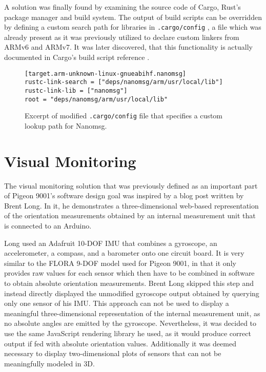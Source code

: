 A solution was finally found by examining the source code of Cargo, Rust's package manager and build system. The output of build scripts can be overridden by defining a custom search path for libraries in \texttt{.cargo/config} \cite{cargo-source}, a file which was already present as it was previously utilized to declare custom linkers from ARMv6 and ARMv7. It was later discovered, that this functionality is actually documented in Cargo's build script reference \cite{cargo-build-reference}.

\begin{figure}[H]
\begin{verbatim}
[target.arm-unknown-linux-gnueabihf.nanomsg]
rustc-link-search = ["deps/nanomsg/arm/usr/local/lib"]
rustc-link-lib = ["nanomsg"]
root = "deps/nanomsg/arm/usr/local/lib"
\end{verbatim}
\caption{Excerpt of modified \texttt{.cargo/config} file that specifies a custom lookup path for Nanomsg.} 
\end{figure}

\newpage

\section{Visual Monitoring}
\author{Sebastian Schaffler}

The visual monitoring solution that was previously defined as an important part of Pigeon 9001's software design goal was inspired by a blog post \cite{visualize-imu-theejs-node} written by Brent Long. In it, he demonstrates a three-dimensional web-based representation of the orientation measurements obtained by an internal measurement unit that is connected to an Arduino.

Long used an Adafruit 10-DOF IMU \cite{adafruit-10dof} that combines a gyroscope, an accelerometer, a compass, and a barometer onto one circuit board. It is very similar to the FLORA 9-DOF \cite{imu} model used for Pigeon 9001, in that it only provides raw values for each sensor which then have to be combined in software to obtain absolute orientation measurements. Brent Long skipped this step and instead directly displayed the unmodified gyroscope output obtained by querying only one sensor of his IMU. 
This approach can not be used to display a meaningful three-dimensional representation of the internal measurement unit, as no absolute angles are emitted by the gyroscope. Nevertheless, it was decided to use the same JavaScript rendering library he used, as it would produce correct output if fed with absolute orientation values. Additionally it was deemed necessary to display two-dimensional plots of sensors that can not be meaningfully modeled in 3D.

